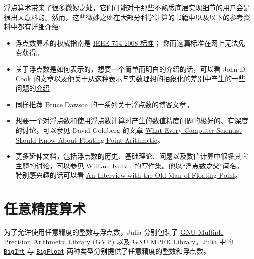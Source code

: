 浮点算术带来了很多微妙之处，它们可能对于那些不熟悉底层实现细节的用户会是很出人意料的。然而，这些微妙之处在大部分科学计算的书籍中以及以下的参考资料中都有详细介绍:



\begin{itemize}
\item 浮点数算术的权威指南是 \href{https://standards.ieee.org/standard/754-2008.html}{IEEE 754-2008 标准}； 然而这篇标准在网上无法免费获得。


\item 关于浮点数是如何表示的，想要一个简单而明白的介绍的话，可以看 John D. Cook 的\href{https://www.johndcook.com/blog/2009/04/06/anatomy-of-a-floating-point-number/}{文章}以及他关于从这种表示与实数理想的抽象化的差别中产生的一些问题的\href{https://www.johndcook.com/blog/2009/04/06/numbers-are-a-leaky-abstraction/}{介绍}


\item 同样推荐 Bruce Dawson 的\href{https://randomascii.wordpress.com/2012/05/20/thats-not-normalthe-performance-of-odd-floats}{一系列关于浮点数的博客文章}。


\item 想要一个对浮点数和使用浮点数计算时产生的数值精度问题的极好的、有深度的讨论，可以参见 David Goldberg 的文章 \href{http://citeseerx.ist.psu.edu/viewdoc/download?doi=10.1.1.22.6768\&rep=rep1\&type=pdf}{What Every Computer Scientist Should Know About Floating-Point Arithmetic}。


\item 更多延伸文档，包括浮点数的历史、基础理论、问题以及数值计算中很多其它主题的讨论，可以参见 \href{https://en.wikipedia.org/wiki/William\_Kahan}{William Kahan} 的\href{https://people.eecs.berkeley.edu/{\textasciitilde}wkahan/}{写作集}。他以“浮点数之父”闻名。特别感兴趣的话可以看 \href{https://people.eecs.berkeley.edu/{\textasciitilde}wkahan/ieee754status/754story.html}{An Interview with the Old Man of Floating-Point}。

\end{itemize}


\hypertarget{6510345620772143535}{}


\section{任意精度算术}



为了允许使用任意精度的整数与浮点数，Julia 分别包装了 \href{https://gmplib.org}{GNU Multiple Precision Arithmetic Library (GMP)} 以及 \href{https://www.mpfr.org}{GNU MPFR Library}。Julia 中的 \hyperlink{423405808990690832}{\texttt{BigInt}} 与 \hyperlink{749816618809421837}{\texttt{BigFloat}} 两种类型分别提供了任意精度的整数和浮点数。



